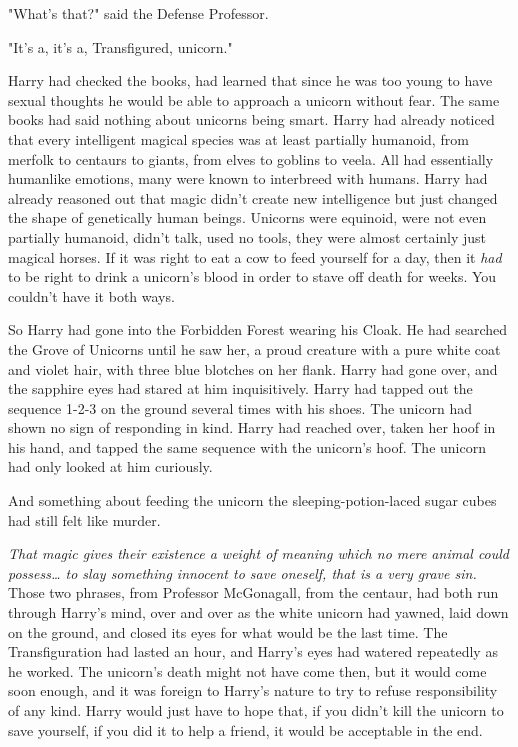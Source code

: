 "What's that?" said the Defense Professor.

"It's a, it's a, Transfigured, unicorn."

Harry had checked the books, had learned that since he was too young to have sexual thoughts he would be able to approach a unicorn without fear. The same books had said nothing about unicorns being smart. Harry had already noticed that every intelligent magical species was at least partially humanoid, from merfolk to centaurs to giants, from elves to goblins to veela. All had essentially humanlike emotions, many were known to interbreed with humans. Harry had already reasoned out that magic didn't create new intelligence but just changed the shape of genetically human beings. Unicorns were equinoid, were not even partially humanoid, didn't talk, used no tools, they were almost certainly just magical horses. If it was right to eat a cow to feed yourself for a day, then it \emph{had} to be right to drink a unicorn's blood in order to stave off death for weeks. You couldn't have it both ways.

So Harry had gone into the Forbidden Forest wearing his Cloak. He had searched the Grove of Unicorns until he saw her, a proud creature with a pure white coat and violet hair, with three blue blotches on her flank. Harry had gone over, and the sapphire eyes had stared at him inquisitively. Harry had tapped out the sequence 1-2-3 on the ground several times with his shoes. The unicorn had shown no sign of responding in kind. Harry had reached over, taken her hoof in his hand, and tapped the same sequence with the unicorn's hoof. The unicorn had only looked at him curiously.

And something about feeding the unicorn the sleeping-potion-laced sugar cubes had still felt like murder.

\emph{That magic gives their existence a weight of meaning which no mere animal could possess{\ldots} to slay something innocent to save oneself, that is a very grave sin.} Those two phrases, from Professor McGonagall, from the centaur, had both run through Harry's mind, over and over as the white unicorn had yawned, laid down on the ground, and closed its eyes for what would be the last time. The Transfiguration had lasted an hour, and Harry's eyes had watered repeatedly as he worked. The unicorn's death might not have come then, but it would come soon enough, and it was foreign to Harry's nature to try to refuse responsibility of any kind. Harry would just have to hope that, if you didn't kill the unicorn to save yourself, if you did it to help a friend, it would be acceptable in the end.

